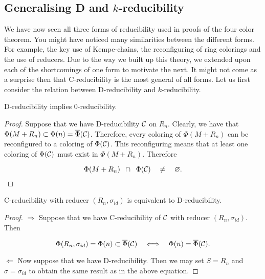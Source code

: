 \subsection{Generalising D and $k$-reducibility}

We have now seen all three forms of reducibility used in proofs of the four color theorem. You might have noticed many similarities between the different forms. For example, the key use of Kempe-chains, the reconfiguring of ring colorings and the use of reducers. Due to the way we built up this theory, we extended upon each of the shortcomings of one form to motivate the next. It might not come as a surprise then that C-reducibility is the most general of all forms.  Let us first consider the relation between D-reducibility and $k$-reducibility. 

\begin{theorem}
    D-reducibility implies 0-reducibility.
\end{theorem}

\begin{proof}
Suppose that we have D-reducibility  $\mathcal{C}$ on $R_n$. Clearly, we have that $\Phi(M+R_n) \subset \Phi(n) = \overline{\Phi}(\mathcal{C})$. Therefore, every coloring of $\Phi(M+R_n)$ can be reconfigured to a coloring of $\Phi(\mathcal{C})$. This reconfiguring means that at least one coloring of $\Phi(\mathcal{C})$ must exist in $\Phi(M+R_n)$. Therefore

\begin{equation}
    \Phi(M+R_n) \;\; \cap \;\;\Phi(\mathcal{C}) \quad \neq  \quad \varnothing.
\end{equation}

\end{proof}

\begin{theorem}
    C-reducibility with reducer $(R_n, \sigma_{id})$ is equivalent to D-reducibility.
\end{theorem}

\begin{proof}
$\Longrightarrow$ Suppose that we have C-reducibility of $\mathcal{C}$ with reducer $(R_n,\sigma_{id})$. Then 

\begin{equation}
    \Phi(R_n, \sigma_{id}) = \Phi(n) \subset \overline{\Phi}(\mathcal{C}) \quad \Longleftrightarrow \quad \Phi(n) = \overline{\Phi}(\mathcal{C}).
\end{equation}

$\Longleftarrow$ Now suppose that we have D-reducibility. Then we may set $S=R_n$ and $\sigma=\sigma_{id}$ to obtain the same result as in the above equation.
\end{proof}


